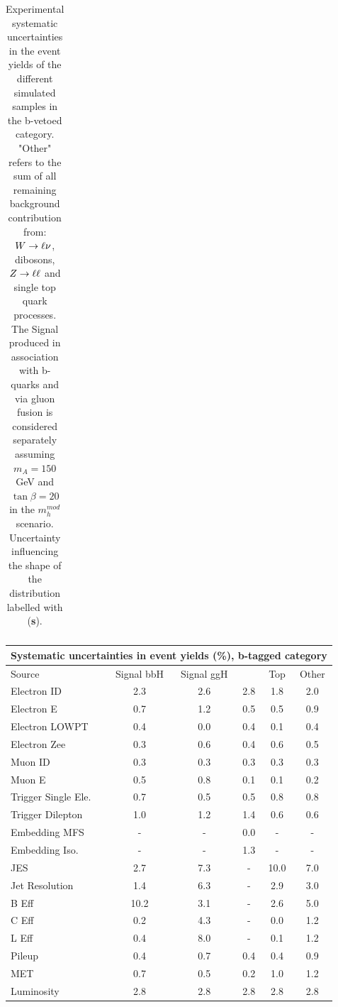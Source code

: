 \begin{table}[!htp]
\begin{tabular}{lccccc}
    \hline
    \hline
  \end{tabular}
  \caption{Experimental systematic uncertainties in the event yields of the different
	simulated samples in the b-vetoed  category. "Other" refers to the sum of all remaining background contribution from: $W\rightarrow \ell \nu$, 
	dibosons, $Z\rightarrow \ell \ell$ and single top quark processes. The Signal produced in association with b-quarks  and via 
	gluon fusion is considered separately assuming $m_{A}=150$ GeV and $\tan\beta=20$ in the $m_h^{mod}$ scenario. 
	Uncertainty influencing the shape of the  \mmc distribution labelled with (\textbf{s}).} 
 \label{tab:ExpSys:bveto}
\end{table}

	
\begin{table}[tp]
  \centering
  \begin{tabular}{lccccc}
    \hline\hline
      	      		   \multicolumn{6}{c}{  Systematic uncertainties in event yields (\%), b-tagged  category}  \\
     \hline
      Source             & Signal bbH 	   & Signal ggH      & \Ztautau      &  Top 	& Other	 \\
    \hline
Electron ID  		 &2.3		   &2.6		     &	2.8          &1.8	&2.0	 \\
Electron E	  	 &0.7		   &1.2		     &0.5	     &0.5	&0.9	 \\
Electron LOWPT	  	 &0.4		   &0.0		     &0.4	     &0.1	&0.4	 \\ 
Electron Zee	  	 &0.3		   &0.6		     &0.4	     &0.6	&0.5	 \\
Muon ID 		 &0.3		   &0.3	   	     &0.3	     &0.3	&0.3	 \\
Muon E		  	 &0.5		   &0.8		     &0.1	     &0.1	&0.2	 \\
Trigger Single	Ele.  	 &0.7		   &0.5		     &0.5	     &0.8	&0.8	 \\
Trigger Dilepton  	 &1.0		   &1.2		     &1.4	     &0.6	&0.6	 \\
Embedding MFS	  	 &-		   &-		     &0.0	     &-		&-	 \\
Embedding Iso.	  	 &-		   &-		     &1.3	     &-		&-	 \\
JES		  	 &2.7		   &7.3		     &-		     &10.0	&7.0	 \\
Jet Resolution	  	 &1.4		   &6.3		     &-		     &2.9	&3.0	 \\
B Eff		  	 &10.2		   &3.1		     &-		     &2.6	&5.0	 \\
C Eff		  	 &0.2		   &4.3		     &-		     &0.0	&1.2	 \\
L Eff		  	 &0.4		   &8.0		     &-		     &0.1	&1.2	 \\
Pileup			 &0.4		   &0.7		     &0.4	     &0.4	&0.9	 \\
MET 		  	 &0.7		   &0.5 	     &0.2	     &1.0	&1.2	 \\
Luminosity	  	 &2.8 		   &2.8	 	     &2.8 	     &2.8 	&2.8 	 \\


\end{tabular}
\end{table}
